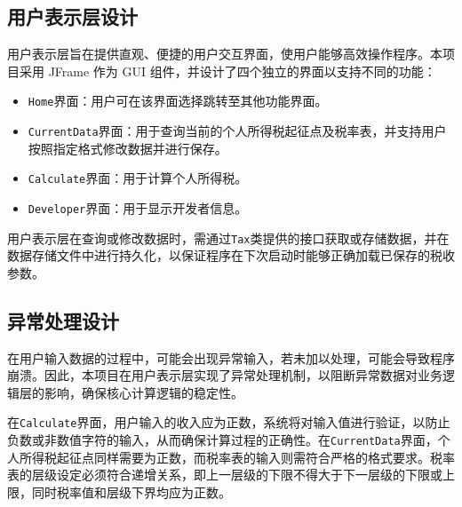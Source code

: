 \documentclass[a4paper, utf8]{ctexart}
\begin{document}
    \subsection{用户表示层设计}

    用户表示层旨在提供直观、便捷的用户交互界面，使用户能够高效操作程序。本项目采用 JFrame 作为 GUI 组件，并设计了四个独立的界面以支持不同的功能：

    \begin{itemize}[itemsep=2pt, topsep=0pt, parsep=0pt]
        \item \verb|Home|界面：用户可在该界面选择跳转至其他功能界面。
        \item \verb|CurrentData|界面：用于查询当前的个人所得税起征点及税率表，并支持用户按照指定格式修改数据并进行保存。
        \item \verb|Calculate|界面：用于计算个人所得税。
        \item \verb|Developer|界面：用于显示开发者信息。
    \end{itemize}

    用户表示层在查询或修改数据时，需通过\verb|Tax|类提供的接口获取或存储数据，并在数据存储文件中进行持久化，以保证程序在下次启动时能够正确加载已保存的税收参数。

    \subsection{异常处理设计}

    在用户输入数据的过程中，可能会出现异常输入，若未加以处理，可能会导致程序崩溃。因此，本项目在用户表示层实现了异常处理机制，以阻断异常数据对业务逻辑层的影响，确保核心计算逻辑的稳定性。

    在\verb|Calculate|界面，用户输入的收入应为正数，系统将对输入值进行验证，以防止负数或非数值字符的输入，从而确保计算过程的正确性。在\verb|CurrentData|界面，个人所得税起征点同样需要为正数，而税率表的输入则需符合严格的格式要求。税率表的层级设定必须符合递增关系，即上一层级的下限不得大于下一层级的下限或上限，同时税率值和层级下界均应为正数。
\end{document}
